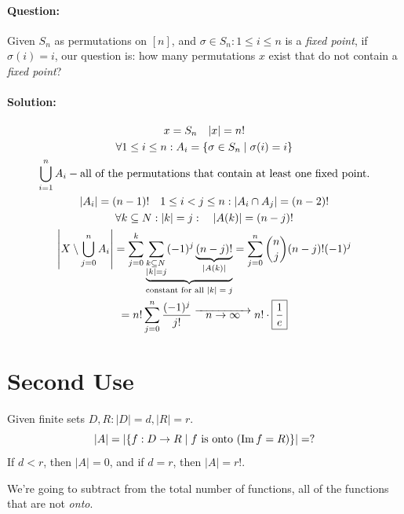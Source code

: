 \documentclass[00_complete]{subfiles}
\begin{document}
\paragraph{Question:}

Given $S_n$ as permutations on $[n]$, and $\sigma \in S_n: 1\leq i \leq n$ is a
\emph{fixed point}, if $\sigma(i)=i$, our question is: how many permutations
$x$ exist that do not contain a \emph{fixed point}?

\paragraph{Solution:}
$$
\begin{gathered}
    x=S_n \quad |x|=n!\\
    \forall 1\leq i \leq n: A_i = \{\sigma \in S_n \mid \sigma(i)=i\}\\
    \bigcup_{i=1}^nA_i - \text{all of the permutations that contain at least one
    fixed point.}\\
    |A_i|=(n-1)! \quad 1 \leq i<j \leq n: |A_i \cap A_j|=(n-2)!\\
    \forall k \subseteq N: |k|=j: \quad |A(k)|=(n-j)!\\
    \left|X
    \setminus\bigcup_{j=0}^nA_i\right|=\sum_{j=0}^k\underbrace{\sum_{\begin{subarray}{1}k
    \subseteq
N\\|k|=j\end{subarray}}(-1)^j\underbrace{(n-j)!}_{|A(k)|}}_{\text{constant for
all $|k|=j$}} = \sum_{j=0}^{n}\binom{n}{j}(n-j)!(-1)^j \\
=n!\sum_{j=0}^n\frac{(-1)^j}{j!} \;\overrightarrow{\quad n \to \infty \quad}\;
n!\cdot\boxed{\frac{1}{e}}
\end{gathered}
$$

\section{Second Use}
Given finite sets $D,R: |D|=d, |R|=r$.
$$
    |A|=|\{f:D\to R \mid f \text{ is onto } (\operatorname{Im} f=R) \}|=?
$$
If $d<r$, then $|A|=0$, and if $d=r$, then $|A|=r!$.

We're going to subtract from the total number of functions, all of the
functions that are not \emph{onto}.
\end{document}
